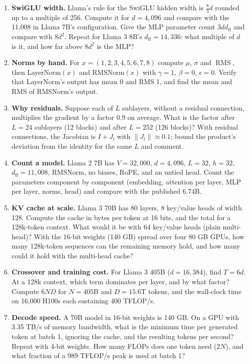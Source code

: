 \documentclass[11pt,letterpaper]{article}
\newcommand{\dff}{d_{\mathrm{ff}}}
\DeclareMathOperator{\RMS}{RMS}
\begin{document}
\begin{enumerate}[leftmargin=1.6em,itemsep=6pt]
\item \textbf{SwiGLU width.} Llama's rule for the SwiGLU hidden width is $\tfrac83d$ rounded up to a multiple of 256. Compute it for $d=4{,}096$ and compare with the 11,008 in Llama 7B's configuration. Give the MLP parameter count $3d\dff$ and compare with $8d^2$. Repeat for Llama 3 8B's $\dff=14{,}336$: what multiple of $d$ is it, and how far above $8d^2$ is the MLP?
\item \textbf{Norms by hand.} For $x=(1,2,3,4,5,6,7,8)$ compute $\mu$, $\sigma$ and $\RMS$, then LayerNorm$(x)$ and RMSNorm$(x)$ with $\gamma=1$, $\beta=0$, $\epsilon=0$. Verify that LayerNorm's output has mean 0 and RMS 1, and find the mean and RMS of RMSNorm's output.
\item \textbf{Why residuals.} Suppose each of $L$ sublayers, without a residual connection, multiplies the gradient by a factor $0.9$ on average. What is the factor after $L=24$ sublayers (12 blocks) and after $L=252$ (126 blocks)? With residual connections, the Jacobian is $I+J_l$ with $\|J_l\|\approx0.1$; bound the product's deviation from the identity for the same $L$ and comment.
\item \textbf{Count a model.} Llama 2 7B has $V=32{,}000$, $d=4{,}096$, $L=32$, $h=32$, $\dff=11{,}008$, RMSNorm, no biases, RoPE, and an untied head. Count the parameters component by component (embedding, attention per layer, MLP per layer, norms, head) and compare with the published 6.74B.
\item \textbf{KV cache at scale.} Llama 3 70B has 80 layers, 8 key/value heads of width 128. Compute the cache in bytes per token at 16 bits, and the total for a 128k-token context. What would it be with 64 key/value heads (plain multi-head)? With the 16-bit weights (140 GB) spread over four 80 GB GPUs, how many 128k-token sequences can the remaining memory hold, and how many could it hold with the multi-head cache?
\item \textbf{Crossover and training cost.} For Llama 3 405B ($d=16{,}384$), find $T=6d$. At a 128k context, which term dominates per layer, and by what factor? Compute $6ND$ for $N=405$B and $D=15.6$T tokens, and the wall-clock time on 16,000 H100s each sustaining 400 TFLOP/s.
\item \textbf{Decode speed.} A 70B model in 16-bit weights is 140 GB. On a GPU with 3.35 TB/s of memory bandwidth, what is the minimum time per generated token at batch 1, ignoring the cache, and the resulting tokens per second? Repeat with 4-bit weights. How many FLOPs does one token need ($2N$), and what fraction of a 989 TFLOP/s peak is used at batch 1?

\end{enumerate}
\end{document}
